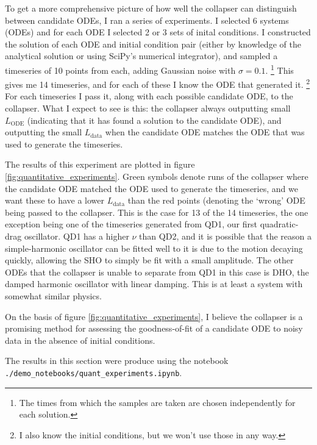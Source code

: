 \documentclass{article}
\begin{document}
To get a more comprehensive picture of how well the collapser can distinguish between candidate ODEs, I ran a series of experiments.
I selected 6 systems (ODEs) and for each ODE I selected 2 or 3 sets of inital conditions.
I constructed the solution of each ODE and initial condition pair (either by knowledge of the analytical solution or using SciPy's numerical integrator), and sampled a timeseries of 10 points from each, adding Gaussian noise with $\sigma = 0.1$.%
\footnote{
The times from which the samples are taken are chosen independently for each solution.
}
This gives me 14 timeseries, and for each of these I know the ODE that generated it.%
\footnote{
I also know the initial conditions, but we won't use those in any way.
}
For each timeseries I pass it, along with each possible candidate ODE, to the collapser.
What I expect to see is this: the collapser always outputting small $L_{\mathrm{ODE}}$ (indicating that it has found a solution to the candidate ODE), and outputting the small $L_{\mathrm{data}}$ when the candidate ODE matches the ODE that was used to generate the timeseries.

The results of this experiment are plotted in figure \ref{fig:quantitative_experiments}.
Green symbols denote runs of the collapser where the candidate ODE matched the ODE used to generate the timeseries, and we want these to have a lower $L_{\mathrm{data}}$ than the red points (denoting the `wrong' ODE being passed to the collapser.
This is the case for 13 of the 14 timeseries, the one exception being one of the timeseries generated from QD1, our first quadratic-drag oscillator.
QD1 has a higher $\nu$ than QD2, and it is possible that the reason a simple-harmonic oscillator can be fitted well to it is due to the motion decaying quickly, allowing the SHO to simply be fit with a small amplitude.
The other ODEs that the collapser is unable to separate from QD1 in this case is DHO, the damped harmonic oscillator with linear damping.
This is at least a system with somewhat similar physics.

On the basis of figure \ref{fig:quantitative_experiments}, I believe the collapser is a promising method for assessing the goodness-of-fit of a candidate ODE to noisy data in the absence of initial conditions.

The results in this section were produce using the notebook \texttt{./demo\_notebooks/quant\_experiments.ipynb}.


\end{document}
